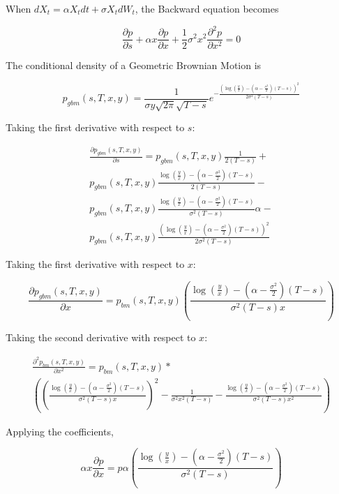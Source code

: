 \documentclass{article}
\theoremstyle{definition}
\begin{document}
When \(dX_t=\alpha X_t dt+\sigma X_t dW_t\), the Backward equation becomes

\[\frac{\partial p} {\partial s} +\alpha x \frac{\partial p}{\partial x} + \frac{1}{2} \sigma^2 x^2 \frac{\partial^2 p}{\partial x^2} =0\]

The conditional density of a Geometric Brownian Motion is

\[p_{gbm}(s, T, x, y)=\frac{1}{\sigma y\sqrt{2\pi} \sqrt{T-s} } e^{-\frac{\left( \log\left(\frac{y}{x}\right) -\left(\alpha-\frac{\sigma^2}{2}\right)(T-s)\right)^2}{2\sigma^2(T-s)}} \]

Taking the first derivative with respect to \(s\):


\begin{multline*}
\frac{\partial p_{gbm}(s, T, x, y)}{\partial s}  =  p_{gbm}(s, T, x, y) \frac{1}{2(T-s)} + \\p_{gbm}(s, T, x, y)\frac{ \log\left(\frac{y}{x}\right) -\left(\alpha-\frac{\sigma^2}{2}\right)(T-s)}{2(T-s)}   - \\p_{gbm}(s, T, x, y)\frac{ \log\left(\frac{y}{x}\right) -\left(\alpha-\frac{\sigma^2}{2}\right)(T-s)}{\sigma^2(T-s)}\alpha  -\\p_{gbm}(s, T, x, y)\frac{\left( \log\left(\frac{y}{x}\right) -\left(\alpha-\frac{\sigma^2}{2}\right)(T-s)\right)^2}{2\sigma^2(T-s)}  
\end{multline*}


Taking the first derivative with respect to \(x\):

\[\frac{\partial p_{gbm}(s, T, x, y)}{\partial x}=  p_{bm}(s, T, x, y)\left(\frac{\log\left(\frac{y}{x}\right)- \left(\alpha-\frac{\sigma^2}{2}\right) (T-s) }{\sigma^2 (T-s)x}\right)  \]

Taking the second derivative with respect to \(x\):

\begin{multline*}\frac{\partial^2 p_{bm}(s, T, x, y)}{\partial x^2}=  p_{bm}(s, T, x, y)*\\\left(  \left(\frac{\log\left(\frac{y}{x}\right)- \left(\alpha-\frac{\sigma^2}{2}\right) (T-s) }{\sigma^2 (T-s)x}\right)^2 -\frac{1}{\sigma^2 x^2 (T-s)} - \frac{\log\left(\frac{y}{x}\right)- \left(\alpha-\frac{\sigma^2}{2}\right) (T-s) }{\sigma^2 (T-s)x^2}   \right) \end{multline*}

Applying the coefficients,

\[\alpha x \frac{\partial p}{\partial x}=p \alpha \left(\frac{\log\left(\frac{y}{x}\right)- \left(\alpha-\frac{\sigma^2}{2}\right) (T-s) }{\sigma^2 (T-s)}\right)\]
\end{document}
